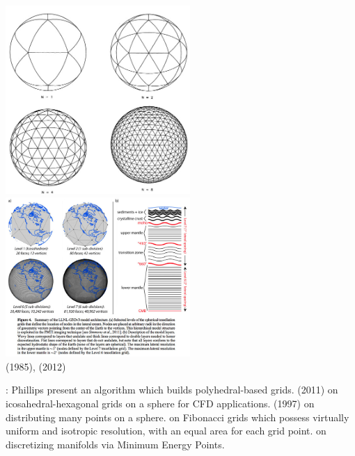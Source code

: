 \begin{center}
\includegraphics[width=7cm]{images/meshes/bafr85}
\includegraphics[width=7cm]{images/meshes/simj12}\\
{\captionfont \textcite{bafr85} (1985), \textcite{simj12} (2012)}
\end{center}


\Literature: Phillips \etal \cite{phdo19} present an algorithm which builds polyhedral-based grids.
\textcite{upsm11} (2011) on icosahedral-hexagonal grids on a sphere for CFD applications.
\textcite{saku97} (1997) on distributing many points on a sphere.
\textcite{swpu06} on Fibonacci grids which possess virtually uniform and isotropic resolution, 
with an equal area for each grid point.
\textcite{hasa04} on discretizing manifolds via Minimum Energy Points.



